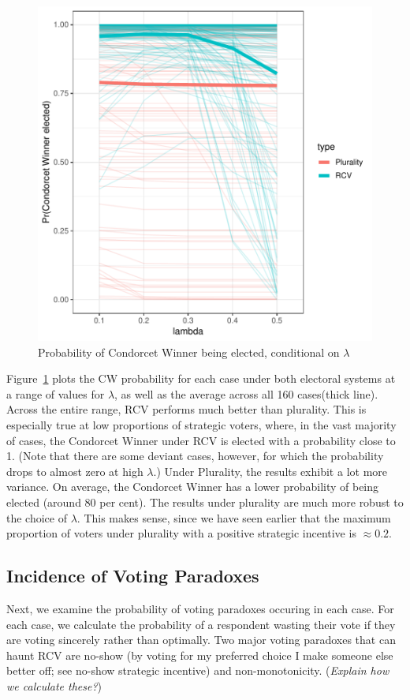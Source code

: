\documentclass[11pt, letter]{article}
\begin{document}
\begin{figure}[tb]
	\centering
	\includegraphics[width = .6 \textwidth]{"../output/figures/condorcet_probs"}
	\caption{Probability of Condorcet Winner being elected, conditional on $\lambda$}
	\label{fig:condorcet}
\end{figure}

Figure~\ref{fig:condorcet} plots the CW probability for each case under both electoral systems at a range of values for $\lambda$, as well as the average across all 160 cases(thick line). Across the entire range, RCV performs much better than plurality. This is especially true at low proportions of strategic voters, where, in the vast majority of cases, the Condorcet Winner under RCV is elected with a probability close to 1. (Note that there are some deviant cases, however, for which the probability drops to almost zero at high $\lambda$.) Under Plurality, the results exhibit a lot more variance. On average, the Condorcet Winner has a lower probability of being elected (around 80 per cent). The results under plurality are much more robust to the choice of $\lambda$. This makes sense, since we have seen earlier that the maximum proportion of voters under plurality with a positive strategic incentive is $\approx 0.2$.

\subsection{Incidence of Voting Paradoxes}

Next, we examine the probability of voting paradoxes occuring in each case. For each case, we calculate the probability of a respondent wasting their vote if they are voting sincerely rather than optimally. Two major voting paradoxes that can haunt RCV are no-show (by voting for my preferred choice I make someone else better off; see no-show strategic incentive) and non-monotonicity. (\emph{Explain how we calculate these?})
\end{document}
